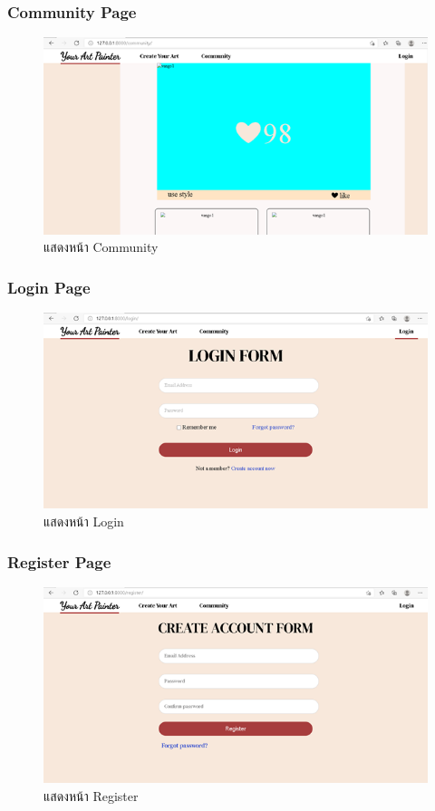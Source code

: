 \documentclass[12pt,oneside,openright,a4paper]{cpe-thai-project}
\begin{document}
\subsubsection{Community Page}
\begin{figure}[p]
  \centering
  \includegraphics[width=12cm]{./image/front-commu.png}
  \caption{แสดงหน้า Community}
  \label{fig:front-commu}
\end{figure}

\subsubsection{Login Page}
\begin{figure}[p]
  \centering
  \includegraphics[width=12cm]{./image/front-login.png}
  \caption{แสดงหน้า Login}
  \label{fig:front-login}
\end{figure}

\subsubsection{Register Page}
\begin{figure}[p]
  \centering
  \includegraphics[width=12cm]{./image/front-regis.png}
  \caption{แสดงหน้า Register}
  \label{fig:front-regis}
\end{figure}
\end{document}
